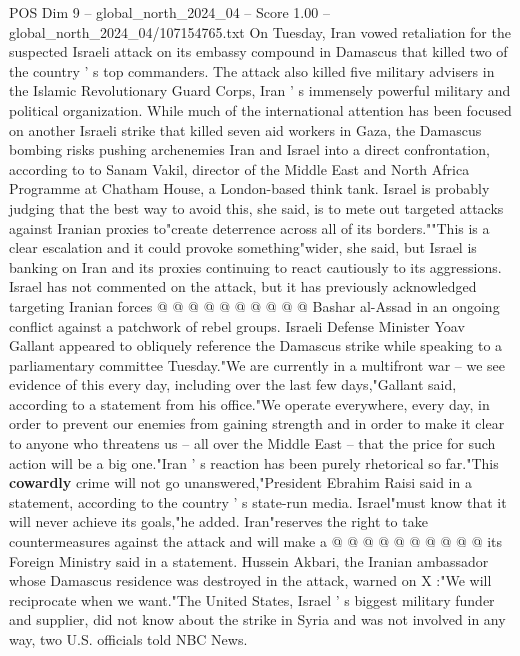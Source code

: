 \begin{textsample}{POS Dim 9 – global\_north\_2024\_04 – Score 1.00 – global\_north\_2024\_04/107154765.txt}  \label{ex:f9_pos_238}
On Tuesday, Iran vowed retaliation for the suspected Israeli attack on its embassy compound in Damascus that killed two of the country ' s top commanders.
The attack also killed five military advisers in the Islamic Revolutionary Guard Corps, Iran ' s immensely powerful military and political organization.
While much of the international attention has been focused on another Israeli strike that killed seven aid workers in Gaza, the Damascus bombing risks pushing archenemies Iran and Israel into a direct confrontation, according to to Sanam Vakil, director of the Middle East and North Africa Programme at Chatham House, a London-based think tank.
Israel is probably judging that the best way to avoid this, she said, is to mete out targeted attacks against Iranian proxies to"create deterrence across all of its borders.""This is a clear escalation and it could provoke something"wider, she said, but Israel is banking on Iran and its proxies continuing to react cautiously to its aggressions.
Israel has not commented on the attack, but it has previously acknowledged targeting Iranian forces @ @ @ @ @ @ @ @ @ @ Bashar al-Assad in an ongoing conflict against a patchwork of rebel groups.
Israeli Defense Minister Yoav Gallant appeared to obliquely reference the Damascus strike while speaking to a parliamentary committee Tuesday."We are currently in a multifront war -- we see evidence of this every day, including over the last few days,"Gallant said, according to a statement from his office."We operate everywhere, every day, in order to prevent our enemies from gaining strength and in order to make it clear to anyone who threatens us -- all over the Middle East -- that the price for such action will be a big one."Iran ' s reaction has been purely rhetorical so far."This \textbf{cowardly} crime will not go unanswered,"President Ebrahim Raisi said in a statement, according to the country ' s state-run media.
Israel"must know that it will never achieve its goals,"he added.
Iran"reserves the right to take countermeasures against the attack and will make a @ @ @ @ @ @ @ @ @ @ its Foreign Ministry said in a statement.
Hussein Akbari, the Iranian ambassador whose Damascus residence was destroyed in the attack, warned on X :"We will reciprocate when we want."The United States, Israel ' s biggest military funder and supplier, did not know about the strike in Syria and was not involved in any way, two U.S. officials told NBC News.

\end{textsample}
